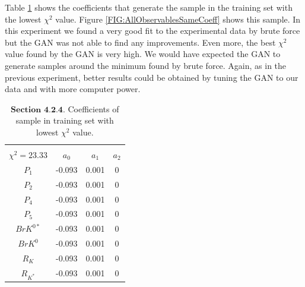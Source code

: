 \documentclass[a4paper,fleqn]{cas-dc}
\begin{document}
Table \ref{tab:GANExp3BestSample} shows the coefficients that generate the sample in the training set with the lowest \(\chi^2\) value. Figure \ref{FIG:AllObservablesSameCoeff} shows this sample. In this experiment we found a very good fit to the experimental data by brute force but the GAN was not able to find any improvements. Even more, the best \(\chi^2\) value found by the GAN is very high. We would have expected the GAN to generate samples around the minimum found by brute force. Again, as in the previous experiment, better results could be obtained by tuning the GAN to our data and with more computer power.
\begin{table}
	\begin{tabular}{ |c|c|c|c|  } 
		\hline
		\small
		\makecell{\(C_9 = -1.33\), \(C_{10} = -0.44\) \\ \(\chi^2 = 23.33 \)}\normalsize
		& \textbf{\(a_0\)} & \textbf{\(a_1\)} & \textbf{\(a_2\)}\\
		\hline
		\(P_1\) & -0.093  & 0.001 &  0 \\
		\hline
		\(P_2\) & -0.093  & 0.001 &  0 \\
		\hline
		\(P_4\) & -0.093  & 0.001 &  0 \\
		\hline
		\(P_5\) & -0.093  & 0.001 &  0 \\		
		\hline
		\(BrK^{0*}\) & -0.093  & 0.001 &  0 \\	
		\hline
		\(BrK^{0}\) & -0.093  & 0.001 &  0 \\		
		\hline	
		\(R_{K}\) & -0.093  & 0.001 &  0 \\
		\hline	
		\(R_{K^*}\) & -0.093  & 0.001 &  0 \\	
		\hline
	\end{tabular}
	\caption{\label{tab:GANExp3BestSample} \(\textbf{Section 4.2.4.}\) Coefficients of sample in training set with lowest \(\chi^2 \) value.}
\end{table}

 
\end{document}
